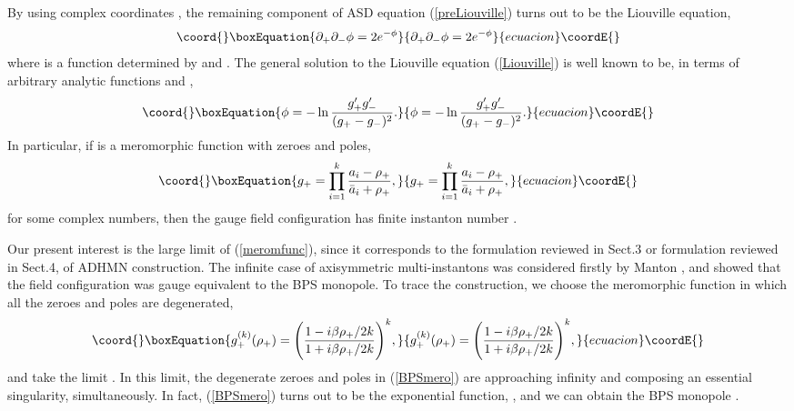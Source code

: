 \documentclass[a4paper,10pt]{article}
\begin{document}
By using complex coordinates \coordHE{}, the remaining component of ASD equation (\ref{preLiouville}) turns out to be the Liouville equation,
\begin{equation}\coord{}\boxEquation{
\partial_{+}\partial_{-}\phi=2e^{-\phi} \label{Liouville}
}{
\partial_{+}\partial_{-}\phi=2e^{-\phi} }{ecuacion}\coordE{}\end{equation}
where \myHighlight{$\phi(\rho_+,\rho_-)$}\coordHE{} is a function determined by \coordHE{} and \myHighlight{$\psi$}\coordHE{}.
The general solution to the Liouville equation (\ref{Liouville}) is well known to be, in terms of arbitrary analytic functions \coordHE{} and \coordHE{}, 
\begin{equation}\coord{}\boxEquation{
\phi=-\ln \frac{g'_{+}g'_{-}}{(g_{+}-g_{-})^2}. \label{solLiouville}
}{
\phi=-\ln \frac{g'_{+}g'_{-}}{(g_{+}-g_{-})^2}. }{ecuacion}\coordE{}\end{equation}
In particular, if \coordHE{} is a meromorphic function with \coordHE{} zeroes and poles,
\begin{equation}\coord{}\boxEquation{
g_+=\prod_{i=1}^k\frac{a_i-\rho_+}{\bar a_i+\rho_+}\label{meromfunc},
}{
g_+=\prod_{i=1}^k\frac{a_i-\rho_+}{\bar a_i+\rho_+},
}{ecuacion}\coordE{}\end{equation}
for \coordHE{} some complex numbers, then the gauge field configuration has finite instanton number \coordHE{}.


Our present interest is the large \coordHE{} limit of (\ref{meromfunc}), since it corresponds to the \coordHE{} formulation reviewed in Sect.3 or \coordHE{} formulation reviewed in Sect.4, of ADHMN construction.
The infinite \coordHE{} case of axisymmetric multi-instantons was considered firstly by Manton \cite{Mant}, and showed that the field configuration was gauge equivalent to the BPS monopole.
To trace the construction, we choose the meromorphic function in which all the zeroes and poles are degenerated,
\begin{equation}\coord{}\boxEquation{
g^{(k)}_+(\rho_+)=\Biggl(\frac{1-{i\beta \rho_+}/{2k}}{1+{i\beta \rho_+}/{2k}}\Biggr)^k, \label{BPSmero}
}{
g^{(k)}_+(\rho_+)=\Biggl(\frac{1-{i\beta \rho_+}/{2k}}{1+{i\beta \rho_+}/{2k}}\Biggr)^k, }{ecuacion}\coordE{}\end{equation}
and take the limit \coordHE{}.
In this limit, the degenerate zeroes and poles in (\ref{BPSmero}) are approaching infinity and composing an essential singularity, simultaneously.
In fact, (\ref{BPSmero}) turns out to be the exponential function, \coordHE{}, and we can obtain the BPS monopole \cite{Mant}.
\end{document}

